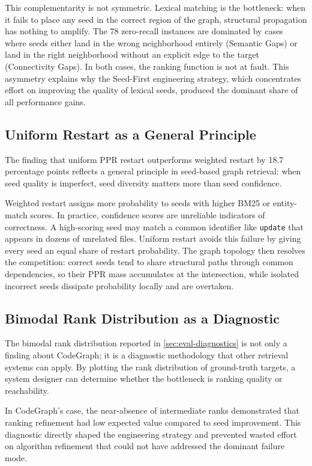 This complementarity is not symmetric. Lexical matching is the bottleneck: when it fails to place any seed in the correct region of the graph, structural propagation has nothing to amplify. The 78 zero-recall instances are dominated by cases where seeds either land in the wrong neighborhood entirely (Semantic Gaps) or land in the right neighborhood without an explicit edge to the target (Connectivity Gaps). In both cases, the ranking function is not at fault. This asymmetry explains why the Seed-First engineering strategy, which concentrates effort on improving the quality of lexical seeds, produced the dominant share of all performance gains.

\subsection{Uniform Restart as a General Principle}
\label{sec:uniform-restart-principle}

The finding that uniform PPR restart outperforms weighted restart by 18.7 percentage points reflects a general principle in seed-based graph retrieval: when seed quality is imperfect, seed diversity matters more than seed confidence.

Weighted restart assigns more probability to seeds with higher BM25 or entity-match scores. In practice, confidence scores are unreliable indicators of correctness. A high-scoring seed may match a common identifier like \texttt{update} that appears in dozens of unrelated files. Uniform restart avoids this failure by giving every seed an equal share of restart probability. The graph topology then resolves the competition: correct seeds tend to share structural paths through common dependencies, so their PPR mass accumulates at the intersection, while isolated incorrect seeds dissipate probability locally and are overtaken.

\subsection{Bimodal Rank Distribution as a Diagnostic}
\label{sec:bimodal-methodology}

The bimodal rank distribution reported in \cref{sec:eval-diagnostics} is not only a finding about CodeGraph; it is a diagnostic methodology that other retrieval systems can apply. By plotting the rank distribution of ground-truth targets, a system designer can determine whether the bottleneck is ranking quality or reachability.

In CodeGraph's case, the near-absence of intermediate ranks demonstrated that ranking refinement had low expected value compared to seed improvement. This diagnostic directly shaped the engineering strategy and prevented wasted effort on algorithm refinement that could not have addressed the dominant failure mode.


